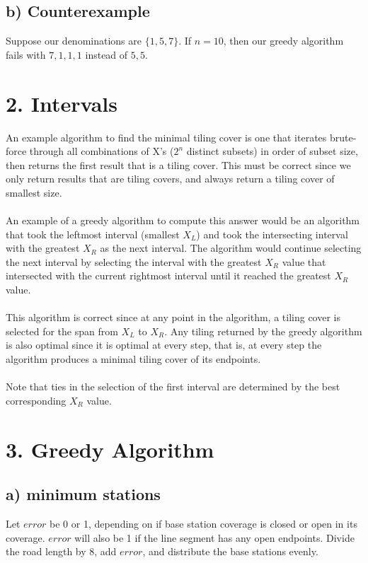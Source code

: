 \documentclass{article}
\begin{document}
\subsection*{b) Counterexample}
Suppose our denominations are $\{1, 5, 7\}$. If $n = 10$, then our greedy
algorithm fails with $7, 1, 1, 1$ instead of $5, 5$.


\section*{2. Intervals}
An example algorithm to find the minimal tiling cover is one that iterates
brute-force through all combinations of X's ($2^n$ distinct subsets) in order
of subset size, then returns the first result that is a tiling cover. This
must be correct since we only return results that are tiling covers, and
always return a tiling cover of smallest size.
\\\\
An example of a greedy algorithm to compute this answer would be an algorithm
that took the leftmost interval (smallest $X_L$) and took the intersecting
interval with the greatest $X_R$ as the next interval. The algorithm would
continue selecting the next interval by selecting the interval with the
greatest $X_R$ value that intersected with the current rightmost interval
until it reached the greatest $X_R$ value.
\\\\
This algorithm is correct since at any point in the algorithm, a tiling cover
is selected for the span from $X_L$ to $X_R$. Any tiling returned by the
greedy algorithm is also optimal since it is optimal at every step, that is,
at every step the algorithm produces a minimal tiling cover of its endpoints.
\\\\
Note that ties in the selection of the first interval are determined by the
best corresponding $X_R$ value.

\section*{3. Greedy Algorithm}
\subsection*{a) minimum stations}
Let $error$ be 0 or 1, depending on if base station coverage is closed or open
in its coverage. $error$ will also be 1 if the line segment has any open
endpoints.
Divide the road length by 8, add $error$, and distribute the base stations
evenly.
\end{document}
